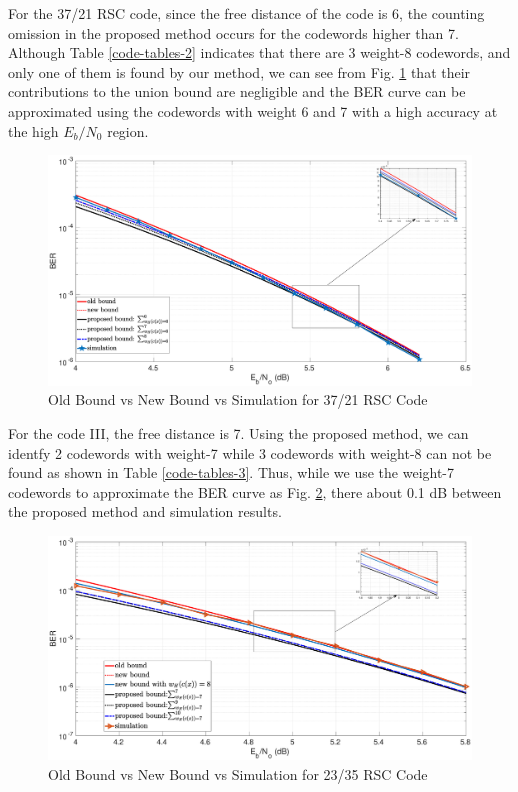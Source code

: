 For the 37/21 RSC code, since the free distance of the code is 6, the counting omission in the proposed method occurs for the codewords higher than 7. Although Table \ref{code-tables-2} indicates that there are 3 weight-8 codewords, and only one of them is found by our method, we can see from Fig. \ref{simFig2} that their contributions to the union bound are negligible and the BER curve can be approximated using the codewords with weight 6 and 7 with a high accuracy at the high $E_b/N_0$ region.

\begin{figure}[htbp]
	\centering
	\includegraphics[width=1\textwidth]{./Images/RSC_37_21_lower_weights3.eps}
	\caption{Old Bound vs New Bound vs Simulation for 37/21 RSC Code}
	\label{simFig2}
\end{figure}

For the code III, the free distance is 7. Using the proposed method, we can identfy 2 codewords with weight-7 while 3 codewords with weight-8 can not be found as shown in Table \ref{code-tables-3}. Thus, while we use the weight-7 codewords to approximate the BER curve as Fig. \ref{simFig3}, there about 0.1 dB between the proposed method and simulation results.

\begin{figure}[htbp]
	\centering
	\includegraphics[width=1\textwidth]{./Images/RSC_23_35_lower_weights3.eps}
	\caption{Old Bound vs New Bound vs Simulation for 23/35 RSC Code}
	\label{simFig3}
\end{figure}

